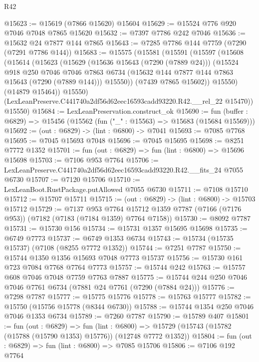 \begin{lexlean}{R42}
\begin{coremodule}
{@15623 := @15619 (@7866 @15620) @15604
@15629 := @15524 @776 @920 @7046 @7048 @7865 @15620
@15632 := @7397 @7786 @242 @7046
@15636 := @15632 @24 @7877 @144 @7865
@15643 := @7285 @7786 @144 @7759 (@7290 (@7291 @7786 @144))
@15683 := @15575
    (@15581
      (@15591
        (@15597
          (@15608
            (@15614
              (@15623
                (@15629
                  (@15636 @15643 (@7290 (@7889 @24)))
                  (@15524
                    @918
                    @250
                    @7046
                    @7046
                    @7863
                    @6734
                    (@15632 @144 @7877 @144 @7863 @15643 (@7290 (@7889 @144)))
                    @15550))
                (@7439 @7865 @15602))
              @15550)
            (@14879 @15464))
          @15550)
        (LexLeanPreserve.C441740a2df56d62eec16593cadd93220.R42.__rel_22 @15470))
      @15550)
@15684 := LexLeanPreservation.construct_ok
@15690 := fun (buffer : @6829) => @15456 (@15562 (fun ("_" : @15563) => @15683 (@15684 @15569)))
@15692 := (out : @6829) -> (lint : @6800) -> @7041
@15693 := @7085 @7768
@15695 := @7045 @15693 @7048
@15696 := @7045 @15695
@15698 := @8251 @7772 @1352
@15701 := fun (out : @6829) => fun (lint : @6800) => @15696 @15698
@15703 := @7106 @953 @7764
@15706 := LexLeanPreserve.C441740a2df56d62eec16593cadd93220.R42.__fits_24 @7055 @6730
@15707 := @7120 @15706
@15710 := LexLeanBoot.RustPackage.putAllowed @7055 @6730
@15711 := @7108 @15710
@15712 := @15707 @15711
@15715 := (out : @6829) -> (lint : @6800) -> @15703 @15712
@15729 := @7137
    @953
    @7764
    @15712
    @1359
    @7787
    (@7166 (@7176 @953))
    (@7182 (@7183 (@7184 @1359) @7764 @7158))
@15730 := @8092 @7787
@15731 := @15730 @156
@15734 := @15731 @1357 @15695 @15698
@15735 := @6749 @7773
@15737 := @6749 @1353 @6734
@15743 := @15734 (@15735 @15737) (@7108 (@8255 @7772 @1352))
@15744 := @7251 @7787
@15750 := @15744 @1350 @1356 @15693 @7048 @7773 @15737
@15756 := @15730 @161 @723 @7084 @7768 @7764 @7773
@15757 := @15744 @242
@15763 := @15757 @608 @7046 @7048 @7759 @7763 @7887
@15775 := @15744 @244 @250 @7046 @7046 @7761 @6734 (@7881 @24 @7761 (@7290 (@7884 @24)))
@15776 := @7298 @7787
@15777 := @15775 @15776
@15778 := @15763 @15777
@15782 := @15750 (@15756 @15778 (@8344 @6730))
@15788 := @15744 @1354 @250 @7046 @7046 @1353 @6734
@15789 := @7260 @7787
@15790 := @15789 @407
@15801 := fun (out : @6829) =>
  fun (lint : @6800) => @15729 (@15743 (@15782 (@15788 (@15790 @1353) @15776)) (@12748 @7772 @1352))
@15804 := fun (out : @6829) => fun (lint : @6800) => @7085 @15706
@15806 := @7106 @192 @7764
}
\end{coremodule}
\end{lexlean}
